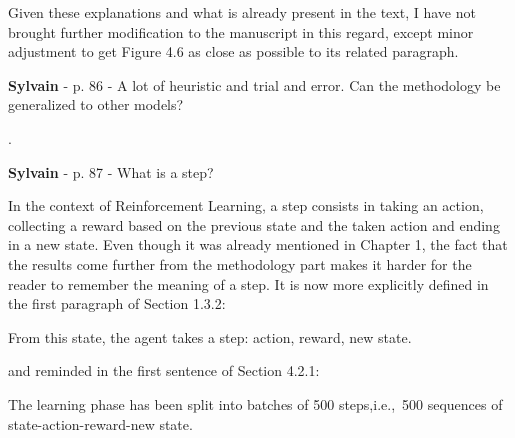 \documentclass[12pt,a4paper]{article}
\def\ie{i.e.,\ }
\begin{document}
Given these explanations and what is already present in the text, I have not brought further modification to the manuscript in this regard, except minor adjustment to get Figure 4.6 as close as possible to its related paragraph.

\begin{mdframed}[style=manuscript] %

\end{mdframed}

\begin{mdframed}[style=comment] %
{\color{purple} \textbf{Sylvain}} - p. 86 - A lot of heuristic and trial and error. Can the methodology be generalized to other models?
\end{mdframed}

\noindent {\color{blue} }. 

\begin{mdframed}[style=manuscript] %

\end{mdframed}

\begin{mdframed}[style=comment] %
{\color{purple} \textbf{Sylvain}} - p. 87 - What is a step?
\end{mdframed}

\noindent In the context of Reinforcement Learning, a step consists in taking an action, collecting a reward based on the previous state and the taken action and ending in a new state. Even though it was already mentioned in Chapter 1, the fact that the results come further from the methodology part makes it harder for the reader to remember the meaning of a step. It is now more explicitly defined {\color{blue}in the first paragraph of Section 1.3.2}:

\begin{mdframed}[style=manuscript] %
From this state, the agent takes a step: action, reward, new state.
\end{mdframed}

\noindent and reminded {\color{blue}in the first sentence of Section 4.2.1}:

\begin{mdframed}[style=manuscript] %
The learning phase has been split into batches of 500 steps,\ie 500 sequences of state-action-reward-new state. 
\end{mdframed}
\end{document}
